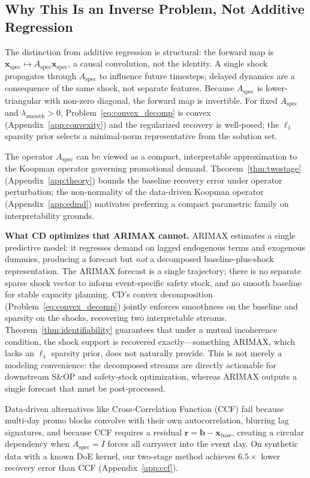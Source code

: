 \documentclass[10pt]{article} %
\theoremstyle{plain}
\theoremstyle{definition}
\newcommand{\xbase}{\mathbf{x}_{\text{base}}}
\newcommand{\Aspec}{A_{\text{spec}}}
\newcommand{\bvec}{\mathbf{b}}
\begin{document}
\subsection{Why This Is an Inverse Problem, Not Additive Regression}

The distinction from additive regression is structural: the forward map is $\mathbf{x}_{\mathrm{spec}} \mapsto A_{\mathrm{spec}}\mathbf{x}_{\mathrm{spec}}$, a causal convolution, not the identity. A single shock propagates through $A_{\mathrm{spec}}$ to influence future timesteps; delayed dynamics are a consequence of the same shock, not separate features. Because $A_{\mathrm{spec}}$ is lower-triangular with non-zero diagonal, the forward map is invertible. For fixed $A_{\mathrm{spec}}$ and $\lambda_{\mathrm{smooth}} > 0$, Problem~\eqref{eq:convex_decomp} is convex (Appendix~\ref{app:convexity}) and the regularized recovery is well-posed; the $\ell_1$ sparsity prior selects a minimal-norm representative from the solution set.

The operator $A_{\text{spec}}$ can be viewed as a compact, interpretable approximation to the Koopman operator governing promotional demand. Theorem~\ref{thm:twostage} (Appendix~\ref{app:theory}) bounds the baseline recovery error under operator perturbation; the non-normality of the data-driven Koopman operator (Appendix~\ref{app:edmd}) motivates preferring a compact parametric family on interpretability grounds.

\textbf{What CD optimizes that ARIMAX cannot.} ARIMAX estimates a single predictive model: it regresses demand on lagged endogenous terms and exogenous dummies, producing a forecast but \emph{not} a decomposed baseline-plus-shock representation. The ARIMAX forecast is a single trajectory; there is no separate sparse shock vector to inform event-specific safety stock, and no smooth baseline for stable capacity planning. CD's convex decomposition (Problem~\eqref{eq:convex_decomp}) jointly enforces smoothness on the baseline and sparsity on the shocks, recovering two interpretable streams. Theorem~\ref{thm:identifiability} guarantees that under a mutual incoherence condition, the shock support is recovered exactly---something ARIMAX, which lacks an $\ell_1$ sparsity prior, does not naturally provide. This is not merely a modeling convenience: the decomposed streams are directly actionable for downstream S\&OP and safety-stock optimization, whereas ARIMAX outputs a single forecast that must be post-processed.

Data-driven alternatives like Cross-Correlation Function (CCF) fail because multi-day promo blocks convolve with their own autocorrelation, blurring lag signatures, and because CCF requires a residual $\mathbf{r} = \bvec - \xbase$, creating a circular dependency when $\Aspec = I$ forces all carryover into the event day. On synthetic data with a known DoE kernel, our two-stage method achieves $6.5\times$ lower recovery error than CCF (Appendix~\ref{app:ccf}).
\end{document}
